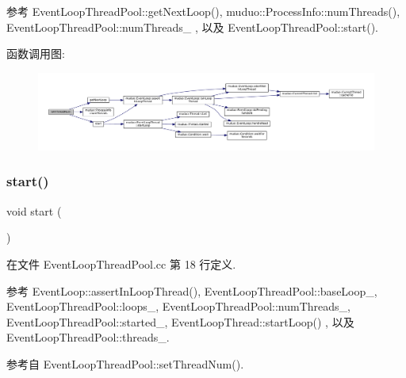 参考 Event\+Loop\+Thread\+Pool\+::get\+Next\+Loop(), muduo\+::\+Process\+Info\+::num\+Threads(), Event\+Loop\+Thread\+Pool\+::num\+Threads\+\_\+ , 以及 Event\+Loop\+Thread\+Pool\+::start().

函数调用图\+:
\nopagebreak
\begin{figure}[H]
\begin{center}
\leavevmode
\includegraphics[width=350pt]{classmuduo_1_1EventLoopThreadPool_a83bb28d139df96ba9fc449b4643f2c36_cgraph}
\end{center}
\end{figure}
\mbox{\label{classmuduo_1_1EventLoopThreadPool_a60de64d75454385b23995437f1d72669}} 
\subsubsection{\texorpdfstring{start()}{start()}}
{\footnotesize\ttfamily void start (\begin{DoxyParamCaption}{ }\end{DoxyParamCaption})}



在文件 Event\+Loop\+Thread\+Pool.\+cc 第 18 行定义.



参考 Event\+Loop\+::assert\+In\+Loop\+Thread(), Event\+Loop\+Thread\+Pool\+::base\+Loop\+\_\+, Event\+Loop\+Thread\+Pool\+::loops\+\_\+, Event\+Loop\+Thread\+Pool\+::num\+Threads\+\_\+, Event\+Loop\+Thread\+Pool\+::started\+\_\+, Event\+Loop\+Thread\+::start\+Loop() , 以及 Event\+Loop\+Thread\+Pool\+::threads\+\_\+.



参考自 Event\+Loop\+Thread\+Pool\+::set\+Thread\+Num().

